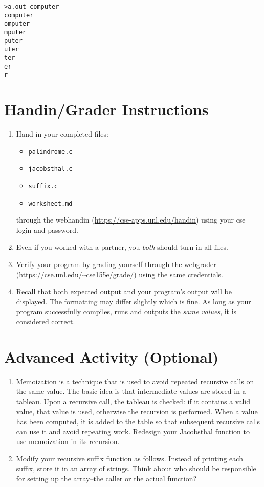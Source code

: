 \documentclass[12pt]{scrartcl}
\begin{document}
\begin{verbatim}
>a.out computer
computer
omputer
mputer
puter
uter
ter
er
r
\end{verbatim}


\section{Handin/Grader Instructions}

\begin{enumerate}
  \item Hand in your completed files:
  \begin{itemize}
    \item \texttt{palindrome.c}
    \item \texttt{jacobsthal.c}
    \item \texttt{suffix.c}
    \item \texttt{worksheet.md}
  \end{itemize}
  through the webhandin (\url{https://cse-apps.unl.edu/handin}) 
  using your cse login and password.  
  \item Even if you worked with a partner, you \emph{both} should
  turn in all files.
  \item Verify your program by grading yourself through the
  webgrader (\url{https://cse.unl.edu/~cse155e/grade/}) using the
  same credentials.
  \item Recall that both expected output and your program's output
  will be displayed.  The formatting may differ slightly which is fine.
  As long as your program successfully compiles, runs and outputs 
  the \emph{same values}, it is considered correct.
\end{enumerate}


\section{Advanced Activity (Optional)}

\begin{enumerate}
  \item Memoization is a technique that is used to avoid repeated 
  	recursive calls on the same value.  The basic idea is that intermediate 
	values are stored in a tableau.  Upon a recursive call, the tableau is 
	checked: if it contains a valid value, that value is used, otherwise the 
	recursion is performed.  When a value has been computed, it is added 
	to the table so that subsequent recursive calls can use it and avoid 
	repeating work.  Redesign your Jacobsthal function to use memoization 
	in its recursion.
  \item Modify your recursive suffix function as follows.  Instead of printing 
	each suffix, store it in an array of strings.  Think about who should be 
	responsible for setting up the array--the caller or the actual function? 
\end{enumerate}
	
\end{document}
